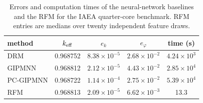 \begin{table}[!htbp]
\centering
\small
\setlength{\tabcolsep}{5pt}
\caption{Errors and computation times of the neural-network baselines and the RFM for the IAEA quarter-core benchmark. RFM entries are medians over twenty independent feature draws.}
\label{tab:experiment4_iea_neutron}
\begin{tabular}{lcccc}
\toprule
method & $k_{\rm eff}$ & $e_k$ & $e_\varphi$ & time (s)\\
\midrule
DRM & 0.968752 & \(8.38\times 10^{-5}\) & \(2.68\times 10^{-2}\) & \(4.24\times 10^{3}\)\\
GIPMNN & 0.968812 & \(2.12\times 10^{-5}\) & \(4.43\times 10^{-2}\) & \(2.85\times 10^{4}\)\\
PC-GIPMNN & 0.968722 & \(1.14\times 10^{-4}\) & \(2.75\times 10^{-2}\) & \(5.39\times 10^{4}\)\\
RFM & 0.968813 & \(2.09\times 10^{-5}\) & \(6.62\times 10^{-3}\) & 13.3\\
\bottomrule
\end{tabular}
\end{table}
